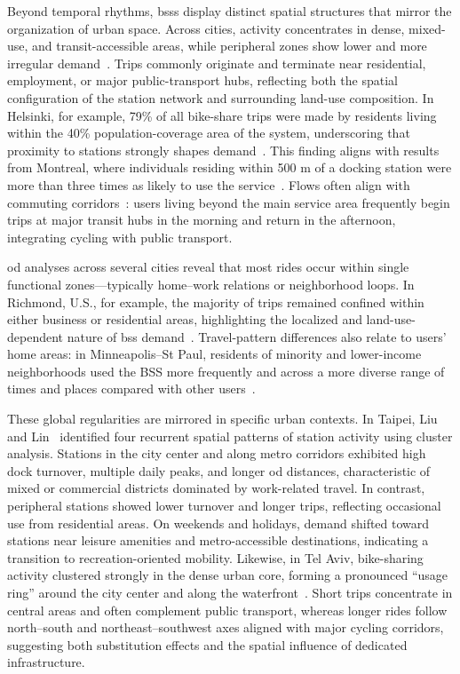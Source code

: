     Beyond temporal rhythms, \acp{bss} display distinct spatial structures that mirror the organization of urban space. Across cities, activity concentrates in dense, mixed-use, and transit-accessible areas, while peripheral zones show lower and more irregular demand~\cite{FaghihImani2017, Willberg2021}. Trips commonly originate and terminate near residential, employment, or major public-transport hubs, reflecting both the spatial configuration of the station network and surrounding land-use composition. In Helsinki, for example, 79\% of all bike-share trips were made by residents living within the 40\% population-coverage area of the system, underscoring that proximity to stations strongly shapes demand~\cite{Willberg2021}. This finding aligns with results from Montreal, where individuals residing within 500 m of a docking station were more than three times as likely to use the service~\cite{BachandMarleau2012}. Flows often align with commuting corridors~\cite{Willberg2021}: users living beyond the main service area frequently begin trips at major transit hubs in the morning and return in the afternoon, integrating cycling with public transport.

    \ac{od} analyses across several cities reveal that most rides occur within single functional zones—typically home–work relations or neighborhood loops. In Richmond, U.S., for example, the majority of trips remained confined within either business or residential areas, highlighting the localized and land-use-dependent nature of \ac{bss} demand~\cite{Yang2024}. Travel-pattern differences also relate to users’ home areas: in Minneapolis–St Paul, residents of minority and lower-income neighborhoods used the BSS more frequently and across a more diverse range of times and places compared with other users~\cite{Wang2019}.

    These global regularities are mirrored in specific urban contexts. In Taipei, Liu and Lin~\cite{Liu2019} identified four recurrent spatial patterns of station activity using cluster analysis. Stations in the city center and along metro corridors exhibited high dock turnover, multiple daily peaks, and longer \ac{od} distances, characteristic of mixed or commercial districts dominated by work-related travel. In contrast, peripheral stations showed lower turnover and longer trips, reflecting occasional use from residential areas. On weekends and holidays, demand shifted toward stations near leisure amenities and metro-accessible destinations, indicating a transition to recreation-oriented mobility. Likewise, in Tel Aviv, bike-sharing activity clustered strongly in the dense urban core, forming a pronounced “usage ring” around the city center and along the waterfront~\cite{Levy2019}. Short trips concentrate in central areas and often complement public transport, whereas longer rides follow north–south and northeast–southwest axes aligned with major cycling corridors, suggesting both substitution effects and the spatial influence of dedicated infrastructure.

